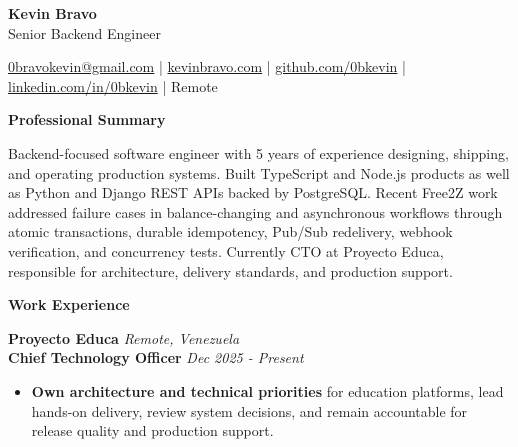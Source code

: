 \documentclass[10pt]{article}
\newcommand{\sectiontitle}[1]{%
    \vspace{4pt}
    \begin{center}
        \textbf{#1}
    \end{center}
    \vspace{-5pt}
}
\begin{document}
\raggedright

\begin{center}
    {\LARGE \textbf{Kevin Bravo}}\\
    Senior Backend Engineer \\
    \hrulefill
\end{center}

\begin{center}
    \href{mailto:0bravokevin@gmail.com}{0bravokevin@gmail.com}
    | 
    \href{https://kevinbravo.com}{kevinbravo.com}
    | 
    \href{https://github.com/0bkevin}{github.com/0bkevin}
    | 
    \href{https://www.linkedin.com/in/0bkevin/}{linkedin.com/in/0bkevin}
    | 
Remote
\end{center}

\fontsize{10}{11.3}\selectfont

\sectiontitle{Professional Summary}
Backend-focused software engineer with 5 years of experience designing, shipping, and operating production systems. Built TypeScript and Node.js products as well as Python and Django REST APIs backed by PostgreSQL. Recent Free2Z work addressed failure cases in balance-changing and asynchronous workflows through atomic transactions, durable idempotency, Pub/Sub redelivery, webhook verification, and concurrency tests. Currently CTO at Proyecto Educa, responsible for architecture, delivery standards, and production support.

\sectiontitle{Work Experience}

\textbf{Proyecto Educa} \hfill \textit{Remote, Venezuela} \\
\textbf{Chief Technology Officer} \hfill \textit{Dec 2025 - Present}
\begin{itemize}
    \item \textbf{Own architecture and technical priorities} for education platforms, lead hands-on delivery, review system decisions, and remain accountable for release quality and production support.
\end{itemize}
\end{document}
